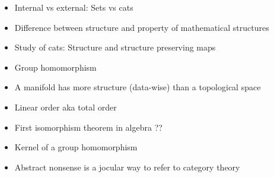 \documentclass{report}
\begin{document}
\begin{itemize}
\item Internal vs external: Sets vs cats
\item Difference between structure and property of mathematical structures
\item Study of cats: Structure and structure preserving maps
\item Group homomorphism
\end{itemize}

\begin{itemize}
\item A manifold has more structure (data-wise) than a topological space
\item Linear order aka total order
\item First isomorphism theorem in algebra ??
\item Kernel of a group homomorphism
\end{itemize}

\begin{itemize}
\item Abstract nonsense is a jocular way to refer to category theory
\end{itemize}


\end{document}
